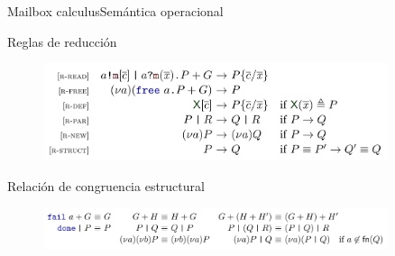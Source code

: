 \documentclass{beamer}
\begin{document}
\begin{frame}{Mailbox calculus}{Semántica operacional}
    \begin{block}{Reglas de reducción}
        \begin{figure}[H]
            \centering
            \includegraphics[width=0.9\textwidth]{reduction-rules}
        \end{figure}
    \end{block}

    \begin{block}{Relación de congruencia estructural}
        \begin{figure}[H]
            \centering
            \includegraphics[width=0.9\textwidth]{structural-congruence}
        \end{figure}
    \end{block}
\end{frame}
\end{document}
